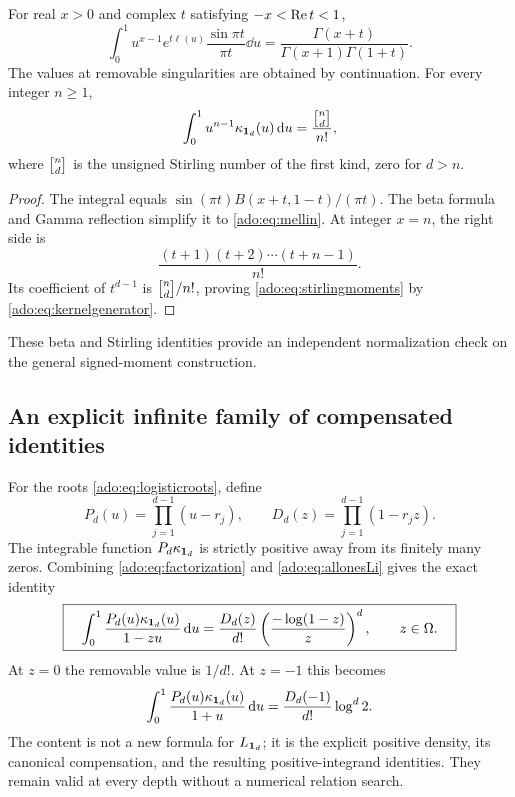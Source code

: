 \begin{proposition}
\label{ado:prop:mellin}
For real $x>0$ and complex $t$ satisfying $-x<\operatorname{Re} t<1$,
\begin{equation}\label{ado:eq:mellin}
 \int_0^1u^{x-1}e^{t\ell(u)}\frac{\sin\pi t}{\pi t}\dd u
 =\frac{\Gamma(x+t)}{\Gamma(x+1)\Gamma(1+t)}.
\end{equation}
The values at removable singularities are obtained by continuation.
For every integer $n\ge1$,
\begin{equation}\label{ado:eq:stirlingmoments}
 \int_0^1u^{n-1}\kappa_{\one_d}(u)\dd u
 =\frac{\bracks{n}{d}}{n!},
\end{equation}
where $\bracks{n}{d}$ is the unsigned Stirling number of the first kind,
zero for $d>n$.
\end{proposition}
\begin{proof}
The integral equals
$\sin(\pi t)B(x+t,1-t)/(\pi t)$. The beta formula and Gamma
reflection simplify it to \eqref{ado:eq:mellin}. At integer $x=n$,
the right side is
\[
 \frac{(t+1)(t+2)\cdots(t+n-1)}{n!}.
\]
Its coefficient of $t^{d-1}$ is $\bracks{n}{d}/n!$, proving
\eqref{ado:eq:stirlingmoments} by \eqref{ado:eq:kernelgenerator}.
\end{proof}
These beta and Stirling identities provide an independent normalization
check on the general signed-moment construction.

\subsection{An explicit infinite family of compensated identities}
For the roots \eqref{ado:eq:logisticroots}, define
\[
 P_d(u)=\prod_{j=1}^{d-1}(u-r_j),\qquad
 D_d(z)=\prod_{j=1}^{d-1}(1-r_jz).
\]
The integrable function $P_d\kappa_{\boldsymbol{1}_d}$ is strictly positive
away from its finitely many zeros. Combining
\eqref{ado:eq:factorization} and \eqref{ado:eq:allonesLi} gives the
exact identity
\begin{equation}\label{ado:eq:generalidentity}
 \boxed{\quad
 \int_0^1\frac{P_d(u)\kappa_{\boldsymbol{1}_d}(u)}{1-zu}\,\mathrm d u
 =\frac{D_d(z)}{d!}
       \left(\frac{-\log(1-z)}z\right)^d,
 \qquad z\in\Omega.
 \quad}
\end{equation}
At $z=0$ the removable value is $1/d!$. At $z=-1$ this becomes
\begin{equation}\label{ado:eq:negativeoneidentity}
 \int_0^1\frac{P_d(u)\kappa_{\boldsymbol{1}_d}(u)}{1+u}\,\mathrm d u
 =\frac{D_d(-1)}{d!}\log^d2.
\end{equation}
The content is not a new formula for $L_{\boldsymbol{1}_d}$; it is the explicit
positive density, its canonical compensation, and the resulting
positive-integrand identities. They remain valid at every depth without
a numerical relation search.

